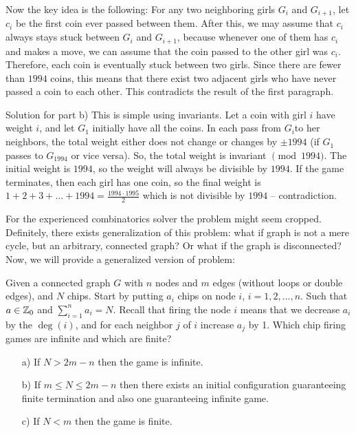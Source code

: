 Now the key idea is the following: For any two neighboring girls $G_i$ and $G_{i+1}$, let $c_i$ be the first coin ever passed between them. After this, we may assume that $c_i$ always stays stuck between $G_i$ and $G_{i+1}$, because whenever one of them has $c_i$ and makes a move, we can assume that the coin passed to the other girl was $c_i$. Therefore, each coin is eventually stuck between two girls. Since there are fewer than $1994$ coins, this means that there exist two adjacent girls who have never passed a coin to each other. This contradicts the result of the first paragraph.

Solution for part b) This is simple using invariants. Let a coin with girl $i$ have weight $i$, and let $G_1$ initially have all the coins. In each pass from $G_i$to her neighbors, the total weight either does not change or changes by $\pm 1994$ (if $G_1$ passes to $G_{1994}$ or vice versa). So, the total weight is invariant $\pmod{1994}$. The initial weight is $1994$, so the weight will always be divisible by $1994$. If the game terminates, then each girl has one coin, so the final weight is $1+2+3+\dots+1994 = \frac{1994\cdot1995}{2}$ which is not divisible by $1994$ -- contradiction.

For the experienced combinatorics solver the problem might seem cropped. Definitely, there exists generalization of this problem: what if graph is not a mere cycle, but an arbitrary, connected graph? Or what if the graph is disconnected? Now, we will provide a generalized version of problem:

\begin{example}
    Given a connected graph $G$ with $n$ nodes and $m$ edges (without loops or double edges), and $N$ chips. Start by putting $a_i$ chips on node $i$, $i=1, 2, \dots, n$. Such that $a \in \mathbb Z_0$ and $\displaystyle\sum_{i=1}^n a_i = N$. Recall that firing the node $i$ means that we decrease $a_i$ by the $\deg(i)$, and for each neighbor $j$ of $i$ increase $a_j$ by 1. Which chip firing games are infinite and which are finite?
\end{example}

\sol 

\begin{itemize}
    \item[a)] If $N > 2m - n$ then the game is infinite.
    \item[b)] If $m \leq N \leq 2m - n$ then there exists an initial configuration guaranteeing finite termination and also one guaranteeing infinite game.
    \item[c)] If $N < m$ then the game is finite.
\end{itemize}

